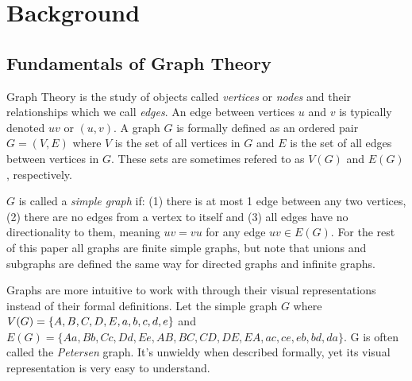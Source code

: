 \chapter{Background}\label{chap:Background}

\section{Fundamentals of Graph Theory}

Graph Theory is the study of objects called \textit{vertices} or \textit{nodes} and their relationships which we call \textit{edges}. An edge between vertices $u$ and $v$ is typically denoted $uv$ or $(u,v)$. A graph $G$ is formally defined as an ordered pair $G = (V,E)$ where $V$ is the set of all vertices in $G$ and $E$ is the set of all edges between vertices in $G$. These sets are sometimes refered to as $V(G)$ and $E(G)$, respectively.

$G$ is called a \textit{simple graph} if: (1) there is at most 1 edge between any two vertices, (2) there are no edges from a vertex to itself and (3) all edges have no directionality to them, meaning $uv=vu$ for any edge $uv\in E(G)$. For the rest of this paper all graphs are finite simple graphs, but note that unions and subgraphs are defined the same way for directed graphs and infinite graphs.

Graphs are more intuitive to work with through their visual representations instead of their formal definitions. Let the simple graph $G$ where $V(G)=\{A,B,C,D,E,a,b,c,\newline d, e\}$ and $E(G)=\{Aa,Bb,Cc,Dd,Ee,AB,BC,CD,DE,EA,ac,ce,eb,bd,da\}$. G is often called the \textit{Petersen} graph. It's unwieldy when described formally, yet its visual representation is very easy to understand.


